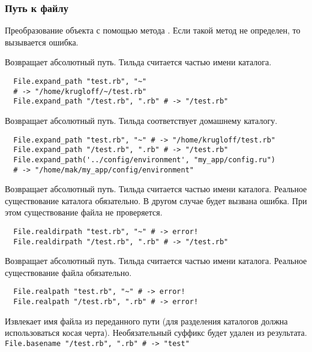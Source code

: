 \subsubsection*{Путь к файлу}

\begin{methodlist}
  Преобразование объекта с помощью метода . Если такой метод не определен, то вызывается ошибка. 

  Возвращает абсолютный путь. Тильда считается частью имени каталога.
  \begin{verbatim}
  File.expand_path "test.rb", "~"
  # -> "/home/krugloff/~/test.rb"
  File.expand_path "/test.rb", ".rb" # -> "/test.rb"
  \end{verbatim}  

  Возвращает абсолютный путь. Тильда соответствует домашнему каталогу.
  \begin{verbatim}
  File.expand_path "test.rb", "~" # -> "/home/krugloff/test.rb" 
  File.expand_path "/test.rb", ".rb" # -> "/test.rb"
  File.expand_path('../config/environment', "my_app/config.ru") 
  # -> "/home/mak/my_app/config/environment"
  \end{verbatim} 

  Возвращает абсолютный путь. Тильда считается частью имени каталога. Реальное существование каталога обязательно. В другом случае будет вызвана ошибка. При этом существование файла не проверяется.
  \begin{verbatim}
  File.realdirpath "test.rb", "~" # -> error!
  File.realdirpath "/test.rb", ".rb" # -> "/test.rb"
  \end{verbatim} 

  Возвращает абсолютный путь. Тильда считается частью имени каталога. Реальное существование файла обязательно.
  \begin{verbatim}
  File.realpath "test.rb", "~" # -> error! 
  File.realpath "/test.rb", ".rb" # -> error!
  \end{verbatim}

  Извлекает имя файла из переданного пути (для разделения каталогов должна использоваться косая черта). Необязательный суффикс будет удален из результата. 
  \\\verb!File.basename "/test.rb", ".rb" # -> "test"!


\end{methodlist}
